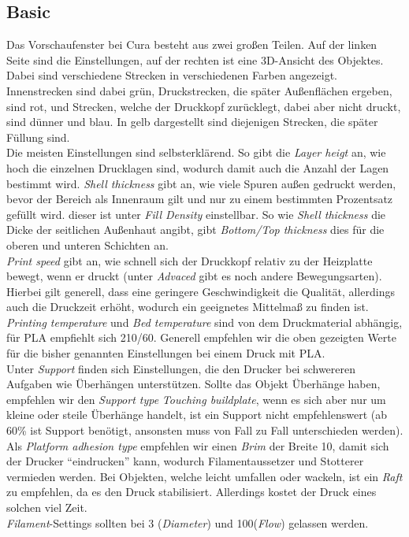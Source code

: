 \documentclass[11pt,a4paper]{scrartcl}
\begin{document}
\subsection{Basic}
Das Vorschaufenster bei Cura besteht aus zwei großen Teilen. Auf der linken Seite sind die Einstellungen, auf der rechten ist eine 3D-Ansicht des Objektes. Dabei sind verschiedene Strecken in verschiedenen Farben angezeigt. Innenstrecken sind dabei grün, Druckstrecken, die später Außenflächen ergeben, sind rot, und Strecken, welche der Druckkopf zurücklegt, dabei aber nicht druckt, sind dünner und blau. In gelb dargestellt sind diejenigen Strecken, die später Füllung sind.\\
Die meisten Einstellungen sind selbsterklärend. So gibt die \textit{Layer heigt} an, wie hoch die einzelnen Drucklagen sind, wodurch damit auch die Anzahl der Lagen bestimmt wird. \textit{Shell thickness} gibt an, wie viele Spuren außen gedruckt werden, bevor der Bereich als Innenraum gilt und nur zu einem bestimmten Prozentsatz gefüllt wird. dieser ist unter \textit{Fill Density} einstellbar. So wie \textit{Shell thickness} die Dicke der seitlichen Außenhaut angibt, gibt \textit{Bottom/Top thickness} dies für die oberen und unteren Schichten an.\\
\textit{Print speed} gibt an, wie schnell sich der Druckkopf relativ zu der Heizplatte bewegt, wenn er druckt (unter \textit{Advaced} gibt es noch andere Bewegungsarten). Hierbei gilt generell, dass eine geringere Geschwindigkeit die Qualität, allerdings auch die Druckzeit erhöht, wodurch ein geeignetes Mittelmaß zu finden ist. \textit{Printing temperature} und \textit{Bed temperature} sind von dem Druckmaterial abhängig, für PLA empfiehlt sich 210/60. Generell empfehlen wir die oben gezeigten Werte für die bisher genannten Einstellungen bei einem Druck mit PLA.\\
Unter \textit{Support} finden sich Einstellungen, die den Drucker bei schwereren Aufgaben wie Überhängen unterstützen. Sollte das Objekt Überhänge haben, empfehlen wir den \textit{Support type} \textit{Touching buildplate}, wenn es sich aber nur um kleine oder steile Überhänge handelt, ist ein Support nicht empfehlenswert (ab 60\% ist Support benötigt, ansonsten muss von Fall zu Fall unterschieden werden). Als \textit{Platform adhesion type} empfehlen wir einen \textit{Brim} der Breite 10, damit sich der Drucker \enquote{eindrucken} kann, wodurch Filamentaussetzer und Stotterer vermieden werden. Bei Objekten, welche leicht umfallen oder wackeln, ist ein \textit{Raft} zu empfehlen, da es den Druck stabilisiert. Allerdings kostet der Druck eines solchen viel Zeit.\\
\textit{Filament}-Settings sollten bei 3 (\textit{Diameter}) und 100(\textit{Flow}) gelassen werden.\\
\\
\end{document}
